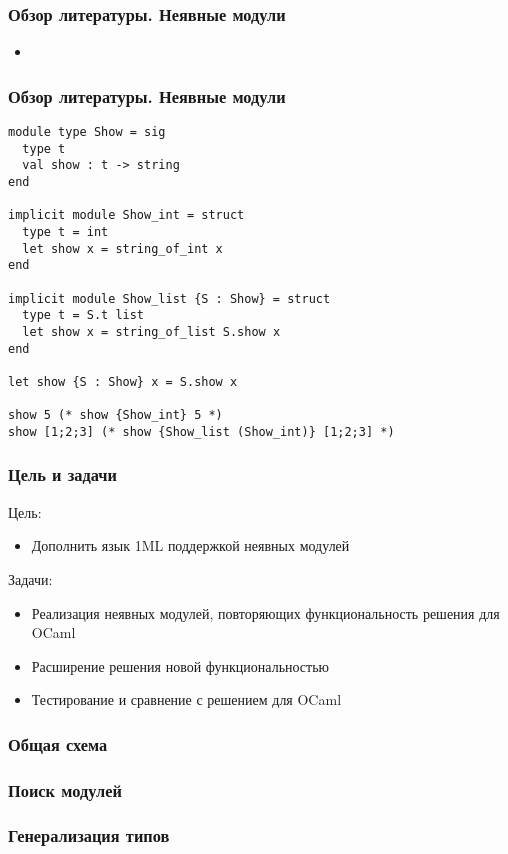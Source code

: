 \documentclass{beamer}
\begin{document}
\begin{frame}\frametitle{Обзор литературы. Неявные модули}
\begin{itemize}
  \item 
\end{itemize}
\end{frame}

\lstset{language=caml}
\begin{frame}[fragile]\frametitle{Обзор литературы. Неявные модули}
\begin{lstlisting}
module type Show = sig
  type t
  val show : t -> string
end

implicit module Show_int = struct
  type t = int
  let show x = string_of_int x
end

implicit module Show_list {S : Show} = struct
  type t = S.t list
  let show x = string_of_list S.show x
end

let show {S : Show} x = S.show x

show 5 (* show {Show_int} 5 *)
show [1;2;3] (* show {Show_list (Show_int)} [1;2;3] *)
\end{lstlisting}
\end{frame}

\begin{frame}\frametitle{Цель и задачи}
Цель:
\begin{itemize}
  \item Дополнить язык 1ML поддержкой неявных модулей
\end{itemize}
Задачи:
\begin{itemize}
  \item Реализация неявных модулей, повторяющих функциональность решения для OCaml
  \item Расширение решения новой функциональностью
  \item Тестирование и сравнение с решением для OCaml
\end{itemize}
\end{frame}

\begin{frame}\frametitle{Общая схема}

\end{frame}

\begin{frame}\frametitle{Поиск модулей}

\end{frame}

\begin{frame}\frametitle{Генерализация типов}

\end{frame}
\end{document}
